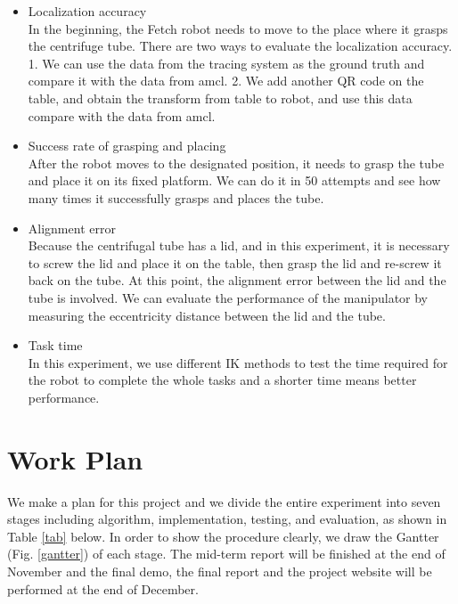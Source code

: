 \documentclass[12pt,draftclsnofoot,onecolumn]{IEEEtran}
\begin{document}
	\begin{itemize}
		\item  Localization accuracy\\
		In the beginning, the Fetch robot needs to move to the place where it grasps the centrifuge tube. There are two ways to evaluate the localization accuracy. 1. We can use the data from the tracing system as the ground truth and compare it with the data from amcl. 2. We add another QR code on the table, and obtain the transform from table to robot, and use this data compare with the data from amcl.
		\item Success rate of grasping and placing\\
				After the robot moves to the designated position, it needs to grasp the tube and place it on its fixed platform. We can do it in 50 attempts and see how many times it successfully grasps and places the tube.
		\item Alignment error\\
		Because the centrifugal tube has a lid, and in this experiment, it is necessary to screw the lid and place it on the table, then grasp the lid and re-screw it back on the tube. At this point, the alignment error between the lid and the tube is involved. We can evaluate the performance of the manipulator by measuring the eccentricity distance between the lid and the tube.
		\item Task time\\
		In this experiment, we use different IK methods to test the time required for the robot to complete the whole tasks and a shorter time means better performance.
		
	\end{itemize}
	
	\section{Work Plan}
	
	
	
	
We make a plan for this project and we divide the entire experiment into seven stages including algorithm, implementation, testing, and evaluation, as shown in Table \ref{tab} below. In order to show the procedure clearly, we draw the Gantter (Fig. \ref{gantter}) of each stage. The mid-term report will be finished at the end of November and the final demo, the final report and the project website will be performed at the end of December.
\end{document}
